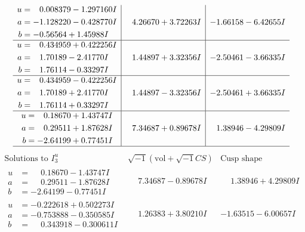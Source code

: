 \documentclass[1p]{elsarticle_modified}
\theoremstyle{definition}
\newcommand{\I}{\sqrt{-1}}
\begin{document}
$$\begin{array}{c|c|c}
\begin{aligned}
u &= \phantom{-}0.008379 - 1.297160 I \\
a &= -1.128220 - 0.428770 I \\
b &= -0.56564 + 1.45988 I\end{aligned}
 & \phantom{-}4.26670 + 3.72263 I & -1.66158 - 6.42655 I \\ \hline\begin{aligned}
u &= \phantom{-}0.434959 + 0.422256 I \\
a &= \phantom{-}1.70189 - 2.41770 I \\
b &= \phantom{-}1.76114 - 0.33297 I\end{aligned}
 & \phantom{-}1.44897 + 3.32356 I & -2.50461 - 3.66335 I \\ \hline\begin{aligned}
u &= \phantom{-}0.434959 - 0.422256 I \\
a &= \phantom{-}1.70189 + 2.41770 I \\
b &= \phantom{-}1.76114 + 0.33297 I\end{aligned}
 & \phantom{-}1.44897 - 3.32356 I & -2.50461 + 3.66335 I \\ \hline\begin{aligned}
u &= \phantom{-}0.18670 + 1.43747 I \\
a &= \phantom{-}0.29511 + 1.87628 I \\
b &= -2.64199 + 0.77451 I\end{aligned}
 & \phantom{-}7.34687 + 0.89678 I & \phantom{-}1.38946 - 4.29809 I\\
 \hline 
 \end{array}$$\newpage$$\begin{array}{c|c|c}  
\text{Solutions to }I^u_{3}& \I (\text{vol} + \sqrt{-1}CS) & \text{Cusp shape}\\
 \hline 
\begin{aligned}
u &= \phantom{-}0.18670 - 1.43747 I \\
a &= \phantom{-}0.29511 - 1.87628 I \\
b &= -2.64199 - 0.77451 I\end{aligned}
 & \phantom{-}7.34687 - 0.89678 I & \phantom{-}1.38946 + 4.29809 I \\ \hline\begin{aligned}
u &= -0.222618 + 0.502273 I \\
a &= -0.753888 - 0.350585 I \\
b &= \phantom{-}0.343918 - 0.300611 I\end{aligned}
 & \phantom{-}1.26383 + 3.80210 I & -1.63515 - 6.00657 I \\ \hline\begin{aligned}

\end{aligned}
\end{array}$$
\end{document}
